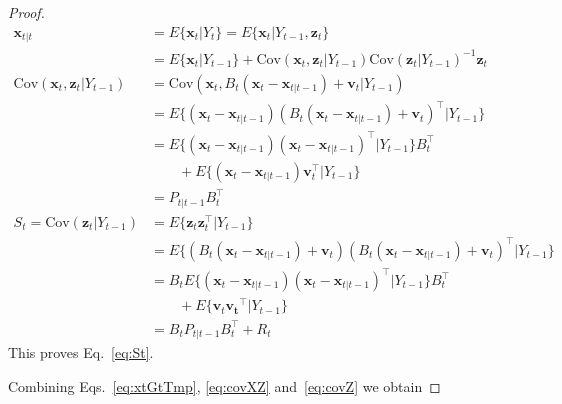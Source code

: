 \documentclass[12pt]{article}
\begin{document}
\begin{proof}
    \begin{align}
        \mathbf{x}_{t|t}&=E\{\mathbf{x}_t|Y_t\}=E\{\mathbf{x}_t|Y_{t-1},\mathbf{z}_t\}\nonumber\\
                        &=E\{\mathbf{x}_t|Y_{t-1}\}+\text{Cov}\left(\mathbf{x}_t,\mathbf{z}_t|Y_{t-1}\right)\text{Cov}\left(\mathbf{z}_t|Y_{t-1}\right)^{-1}\mathbf{z}_t\label{eq:xtGtTmp}\\
        \text{Cov}\left(\mathbf{x}_t,\mathbf{z}_t|Y_{t-1}\right)&=\text{Cov}\left(\mathbf{x}_t,B_t(\mathbf{x}_t-\mathbf{x}_{t|t-1})+\mathbf{v}_t|Y_{t-1}\right)\nonumber\\
                                                                &=E\{(\mathbf{x}_t-\mathbf{x}_{t|t-1})(B_t(\mathbf{x}_t-\mathbf{x}_{t|t-1})+\mathbf{v}_t)^\intercal|Y_{t-1}\}\nonumber\\
                                                                &=E\{(\mathbf{x}_t-\mathbf{x}_{t|t-1})(\mathbf{x}_t-\mathbf{x}_{t|t-1})^\intercal|Y_{t-1}\}B_t^\intercal\nonumber\\
                                                                &\qquad +E\{(\mathbf{x}_t-\mathbf{x}_{t|t-1})\mathbf{v}_t^\intercal|Y_{t-1}\}\nonumber\\
                                                                &=P_{t|t-1}B_t^\intercal\label{eq:covXZ}\\
        S_t=\text{Cov}\left(\mathbf{z}_t|Y_{t-1}\right)&=E\{\mathbf{z}_t\mathbf{z}_t^\intercal|Y_{t-1}\}\nonumber\\
                                                       &=E\{\left(B_t(\mathbf{x}_t-\mathbf{x}_{t|t-1})+\mathbf{v}_t\right)\left(B_t(\mathbf{x}_t-\mathbf{x}_{t|t-1})+\mathbf{v}_t\right)^\intercal|Y_{t-1}\}\nonumber\\
                                                       &=B_tE\{\left(\mathbf{x}_t-\mathbf{x}_{t|t-1}\right)\left(\mathbf{x}_t-\mathbf{x}_{t|t-1}\right)^\intercal|Y_{t-1}\}B_t^\intercal\nonumber\\
                                                       &\qquad +E\{\mathbf{v}_t\mathbf{v_t}^\intercal|Y_{t-1}\}\nonumber\\
                                                       &=B_tP_{t|t-1}B_t^\intercal+R_t\label{eq:covZ}
    \end{align}
	This proves Eq.~\ref{eq:St}.

    Combining Eqs.~\ref{eq:xtGtTmp}, \ref{eq:covXZ} and~\ref{eq:covZ} we obtain


\end{proof}
\end{document}
